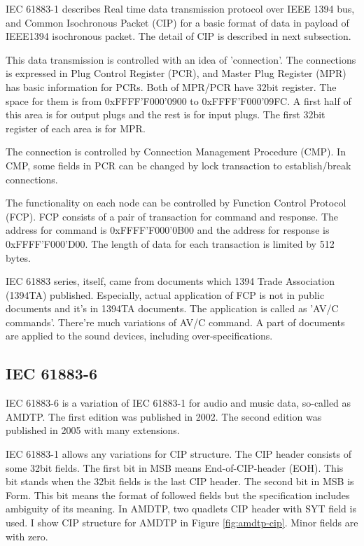 \documentclass[onecolumn]{article}
\begin{document}
IEC 61883-1 describes Real time data transmission protocol over IEEE 1394 bus, and Common Isochronous Packet (CIP) for a basic format of data in payload of IEEE1394 isochronous packet. The detail of CIP is described in next subsection.

This data transmission is controlled with an idea of 'connection'. The connections is expressed in Plug Control Register (PCR), and Master Plug Register (MPR) has basic information for PCRs. Both of MPR/PCR have 32bit register. The space for them is from 0xFFFF'F000'0900 to 0xFFFF'F000'09FC. A first half of this area is for output plugs and the rest is for input plugs. The first 32bit register of each area is for MPR.

The connection is controlled by Connection Management Procedure (CMP). In CMP, some fields in PCR can be changed by lock transaction to establish/break connections.

The functionality on each node can be controlled by Function Control Protocol (FCP). FCP consists of a pair of transaction for command and response. The address for command is 0xFFFF'F000'0B00 and the address for response is 0xFFFF'F000'D00. The length of data for each transaction is limited by 512 bytes.

IEC 61883 series, itself, came from documents which 1394 Trade Association (1394TA) published. Especially, actual application of FCP is not in public documents and it's in 1394TA documents. The application is called as 'AV/C commands'. There're much variations of AV/C command. A part of documents are applied to the sound devices, including over-specifications\cite{avc-general-4-2, avc-audio-1, avc-music-1, avc-descriptor-1, avc-info-block-1, avc-stream-format-1, avc-stream-format-1-1, avc-rate-control}.


\subsection{IEC 61883-6}

IEC 61883-6 is a variation of IEC 61883-1 for audio and music data, so-called as AMDTP. The first edition was published in 2002\cite{iec61883-6-1}. The second edition was published in 2005 with many extensions\cite{iec61883-6-2}.

IEC 61883-1\cite{iec61883-1-1, iec61883-1-2, iec61883-1-3} allows any variations for CIP structure. The CIP header consists of some 32bit fields. The first bit in MSB means End-of-CIP-header (EOH). This bit stands when the 32bit fields is the last CIP header. The second bit in MSB is Form. This bit means the format of followed fields but the specification includes ambiguity of its meaning. In AMDTP, two quadlets CIP header with SYT field is used. I show CIP structure for AMDTP in Figure \ref{fig:amdtp-cip}. Minor fields are with zero.
\end{document}
